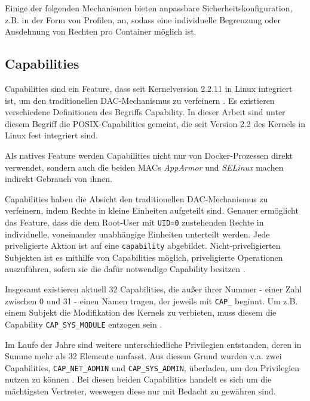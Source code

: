 \documentclass[../main.tex]{subfiles}
\begin{document}
		Einige der folgenden Mechanismen bieten anpassbare Sicherheitskonfiguration, z.B. in der Form von Profilen, an, sodass eine individuelle Begrenzung oder Ausdehnung von Rechten pro Container möglich ist.

    \subsection{Capabilities}
		\label{capabilities}
			Capabilities sind ein Feature, dass seit Kernelversion 2.2.11 in Linux integriert ist, um den traditionellen DAC-Mechanismus zu verfeinern \cite[S.42]{SELinuxApparmor}. Es existieren verschiedene Definitionen des Begriffs \glqq{}Capability\grqq{}. In dieser Arbeit sind unter diesem Begriff die POSIX-Capabilities gemeint, die seit Version 2.2 des Kernels in Linux fest integriert sind.

			Als natives Feature werden Capabilities nicht nur von Docker-Prozessen direkt verwendet, sondern auch die beiden MACs \emph{AppArmor} und \emph{SELinux} machen indirekt Gebrauch von ihnen.

			Capabilities haben die Absicht den traditionellen DAC-Mechanismus zu verfeinern, indem Rechte in kleine Einheiten aufgeteilt sind. Genauer ermöglicht das Feature, dass die dem Root-User mit \texttt{UID=0} zustehenden Rechte in individuelle, voneinander unabhängige Einheiten unterteilt werden. Jede priveligierte Aktion ist auf eine \texttt{capability} abgebildet. Nicht-priveligierten Subjekten ist es mithilfe von Capabilities möglich, priveligierte Operationen auszuführen, sofern sie die dafür notwendige Capability besitzen \cite[S.33]{linuxInterface}\cite[S.39]{SELinuxApparmor}.

			Insgesamt existieren aktuell 32 Capabilities, die außer ihrer Nummer - einer Zahl zwischen 0 und 31 - einen Namen tragen, der jeweils mit \texttt{CAP\_} beginnt. Um z.B. einem Subjekt die Modifikation des Kernels zu verbieten, muss diesem die Capability \texttt{CAP\_SYS\_MODULE} entzogen sein \cite[S.42]{SELinuxApparmor}.

			Im Laufe der Jahre sind weitere unterschiedliche Privilegien entstanden, deren in Summe mehr als 32 Elemente umfasst. Aus diesem Grund wurden v.a. zwei Capabilities, \texttt{CAP\_NET\_ADMIN} und \texttt{CAP\_SYS\_ADMIN}, überladen, um den Privilegien nutzen zu können \cite[S.40f.]{SELinuxApparmor}. Bei diesen beiden Capabilities handelt es sich um die mächtigsten Vertreter, weswegen diese nur mit Bedacht zu gewähren sind.
\end{document}
